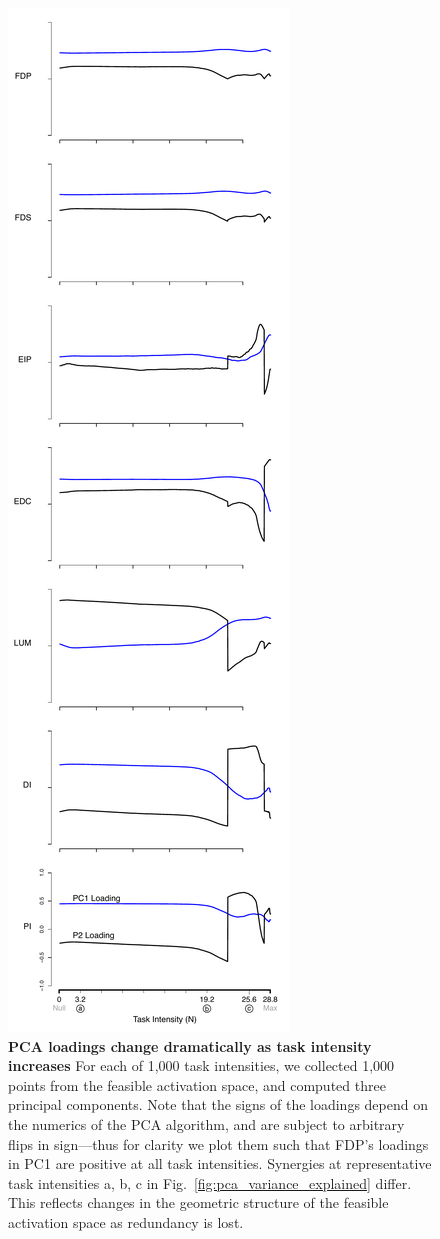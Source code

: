 \documentclass[9pt,twocolumn,twoside,lineno]{pnas-new}
\begin{document}
\begin{figure}[htbp]
\centering
\includegraphics[height=0.40\textheight]{supplemental_figures/pc_loadings_FDP_made_positive.pdf}
\caption{\textbf{PCA loadings change dramatically as task intensity increases} For each of 1,000 task intensities, we collected 1,000 points from the feasible activation space, and computed three principal components.
Note that the signs of the loadings depend on the numerics of the PCA algorithm, and are subject to arbitrary flips in sign---thus for clarity we plot them such that FDP's loadings in PC1 are positive at all task intensities.
Synergies at representative task intensities a, b, c in Fig.~\ref{fig:pca_variance_explained} differ. This reflects changes in the geometric structure of the feasible activation space as redundancy is lost.}
\label{fig:pca_loadings_detail}
\end{figure}
\end{document}
